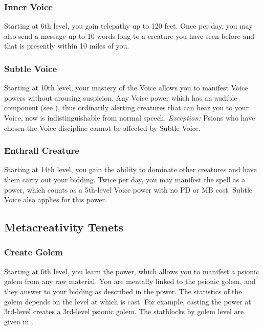\subsubsection{Inner Voice}
Starting at 6th level,
you gain telepathy up to 120 feet.
Once per day,
you may also send a message up to 10 words long
to a creature you have seen before and that is
presently within 10 miles of you.

\subsubsection{Subtle Voice}
Starting at 10th level,
your mastery of the Voice allows you to manifest Voice
powers without arousing suspicion.
Any Voice power which has an audible component
(see ),
thus ordinarily alerting creatures that can hear you to your Voice,
now is indistinguishable from normal speech.
\emph{Exception:} Psions who have chosen the Voice discipline
cannot be affected by Subtle Voice.

\subsubsection{Enthrall Creature}
Starting at 14th level,
you gain the ability to dominate other creatures and have them
carry out your bidding.
Twice per day,
you may manifest the  spell as a power,
which counts as a 5th-level Voice power with no PD or MB cost.
Subtle Voice also applies for this power.

\subsection{Metacreativity Tenets}
\label{sub:metacreativity_tenets}
\subsubsection{Create Golem}
\label{subs:menu_a}
Starting at 6th level,
you learn the  power,
which allows you to manifest a psionic golem
from any raw material.
You are mentally linked to the psionic golem,
and they answer to your bidding as described in the power.
The statistics of the golem depends on the level
at which  is cast.
For example,
casting the power at 3rd-level creates a 3rd-level psionic golem.
The statblocks by golem level are given in .

